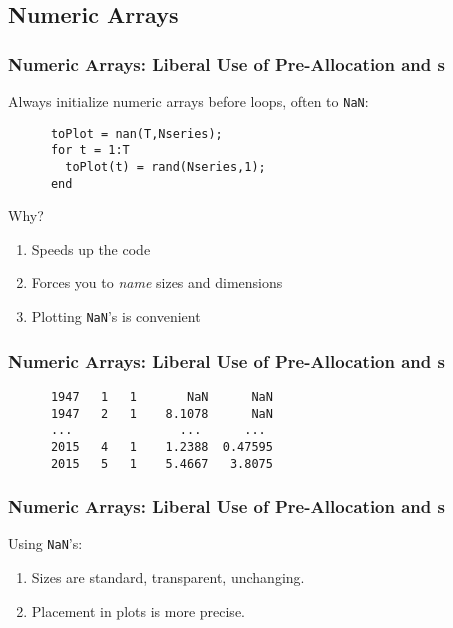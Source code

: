 \documentclass{beamer}
\begin{document}
\subsection{Numeric Arrays}
  \begin{frame}[fragile]
    \frametitle{Numeric Arrays: Liberal Use of Pre-Allocation and s}

    Always initialize numeric arrays before loops, often to
    \texttt{NaN}:
    \begin{lstlisting}
      toPlot = nan(T,Nseries);
      for t = 1:T
        toPlot(t) = rand(Nseries,1);
      end
    \end{lstlisting}
    Why?
    \begin{enumerate}
      \item Speeds up the code
      \item Forces you to \emph{name} sizes and dimensions
      \item Plotting \texttt{NaN}'s is convenient
    \end{enumerate}

	\end{frame}

  \begin{frame}[fragile]
    \frametitle{Numeric Arrays: Liberal Use of Pre-Allocation and s}

    \begin{lstlisting}
      1947   1   1       NaN      NaN
      1947   2   1    8.1078      NaN
      ...               ...      ...
      2015   4   1    1.2388  0.47595
      2015   5   1    5.4667   3.8075
    \end{lstlisting}
    \pause
	\end{frame}

  \begin{frame}[fragile]
    \frametitle{Numeric Arrays: Liberal Use of Pre-Allocation and s}

    Using \texttt{NaN}'s:
    \begin{enumerate}
      \item Sizes are standard, transparent, unchanging.
      \item Placement in plots is more precise.
    \end{enumerate}
	\end{frame}
\end{document}
